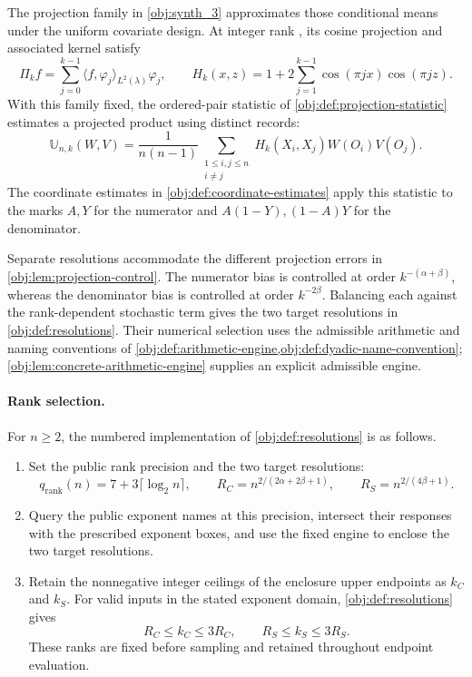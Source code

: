 \documentclass[11pt]{article}
\begin{document}
The projection family in \cref{obj:synth_3} approximates those conditional means under the uniform covariate design. At integer rank , its cosine projection and associated kernel satisfy
\[
\Pi_k f
=
\sum_{j=0}^{k-1}
\langle f,\varphi_j\rangle_{L^2(\lambda)}\varphi_j,
\qquad
H_k(x,z)
=
1+2\sum_{j=1}^{k-1}\cos(\pi jx)\cos(\pi jz).
\]
With this family fixed, the ordered-pair statistic of \cref{obj:def:projection-statistic} estimates a projected product using distinct records:
\[
\mathbb U_{n,k}(W,V)
=
\frac{1}{n(n-1)}
\sum_{\substack{1\le i,j\le n\\i\ne j}}
H_k(X_i,X_j)W(O_i)V(O_j).
\]
The coordinate estimates in \cref{obj:def:coordinate-estimates} apply this statistic to the marks \(A,Y\) for the numerator and \(A(1-Y),(1-A)Y\) for the denominator.

Separate resolutions accommodate the different projection errors in \cref{obj:lem:projection-control}. The numerator bias is controlled at order \(k^{-(\alpha+\beta)}\), whereas the denominator bias is controlled at order \(k^{-2\beta}\). Balancing each against the rank-dependent stochastic term gives the two target resolutions in \cref{obj:def:resolutions}. Their numerical selection uses the admissible arithmetic and naming conventions of \cref{obj:def:arithmetic-engine,obj:def:dyadic-name-convention}; \cref{obj:lem:concrete-arithmetic-engine} supplies an explicit admissible engine.

\paragraph{Rank selection.}
For \(n\ge2\), the numbered implementation of \cref{obj:def:resolutions} is as follows.
\begin{enumerate}
\item Set the public rank precision  and the two target resolutions:
\[
q_{\mathrm{rank}}(n)=7+3\lceil\log_2 n\rceil,
\qquad
R_C=n^{2/(2\alpha+2\beta+1)},
\qquad
R_S=n^{2/(4\beta+1)}.
\]
\item Query the public exponent names at this precision, intersect their responses with the prescribed exponent boxes, and use the fixed engine to enclose the two target resolutions.
\item Retain the nonnegative integer ceilings of the enclosure upper endpoints as \(k_C\) and \(k_S\). For valid inputs in the stated exponent domain, \cref{obj:def:resolutions} gives
\[
R_C\le k_C\le3R_C,
\qquad
R_S\le k_S\le3R_S.
\]
These ranks are fixed before sampling and retained throughout endpoint evaluation.
\end{enumerate}
\end{document}
